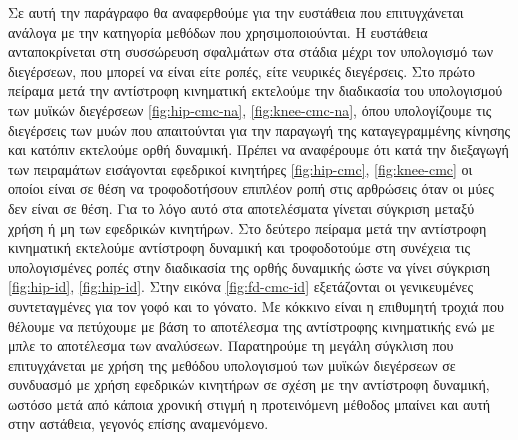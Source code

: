Σε αυτή την παράγραφο θα αναφερθούμε για την ευστάθεια που επιτυγχάνεται ανάλογα με την κατηγορία μεθόδων που χρησιμοποιούνται. Η ευστάθεια ανταποκρίνεται στη συσσώρευση σφαλμάτων στα στάδια μέχρι τον υπολογισμό των διεγέρσεων, που μπορεί να είναι είτε ροπές, είτε νευρικές διεγέρσεις. Στο πρώτο πείραμα μετά την αντίστροφη κινηματική εκτελούμε την διαδικασία του υπολογισμού των μυϊκών διεγέρσεων \ref{fig:hip-cmc-na}, \ref{fig:knee-cmc-na}, όπου υπολογίζουμε τις διεγέρσεις των μυών που απαιτούνται για την παραγωγή της καταγεγραμμένης κίνησης και κατόπιν εκτελούμε ορθή δυναμική. Πρέπει να αναφέρουμε ότι κατά την διεξαγωγή των πειραμάτων εισάγονται εφεδρικοί κινητήρες \ref{fig:hip-cmc}, \ref{fig:knee-cmc} οι οποίοι είναι σε θέση να τροφοδοτήσουν επιπλέον ροπή στις αρθρώσεις όταν οι μύες δεν είναι σε θέση. Για το λόγο αυτό στα αποτελέσματα γίνεται σύγκριση μεταξύ χρήση ή μη των εφεδρικών κινητήρων. Στο δεύτερο πείραμα μετά την αντίστροφη κινηματική εκτελούμε αντίστροφη δυναμική και τροφοδοτούμε στη συνέχεια τις υπολογισμένες ροπές στην διαδικασία της ορθής δυναμικής ώστε να γίνει σύγκριση \ref{fig:hip-id}, \ref{fig:hip-id}. Στην εικόνα \ref{fig:fd-cmc-id} εξετάζονται οι γενικευμένες συντεταγμένες για τον γοφό και το γόνατο. Με κόκκινο είναι η επιθυμητή τροχιά που θέλουμε να πετύχουμε με βάση το αποτέλεσμα της αντίστροφης κινηματικής ενώ με μπλε το αποτέλεσμα των αναλύσεων. Παρατηρούμε τη μεγάλη σύγκλιση που επιτυγχάνεται με χρήση της μεθόδου υπολογισμού των μυϊκών διεγέρσεων σε συνδυασμό με χρήση εφεδρικών κινητήρων σε σχέση με την αντίστροφη δυναμική, ωστόσο μετά από κάποια χρονική στιγμή η προτεινόμενη μέθοδος μπαίνει και αυτή στην αστάθεια, γεγονός επίσης αναμενόμενο.


